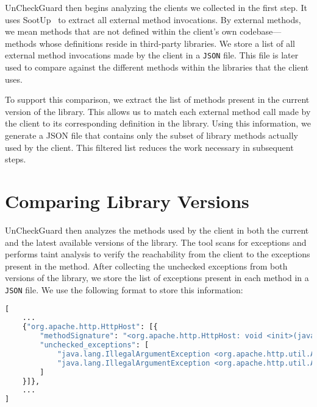 
UnCheckGuard then begins analyzing the clients we collected in the first step. It uses SootUp~\cite{Karakaya24:_SootUp} to extract all external method invocations. By external methods, we mean methods that are not defined within the client's own codebase—methods whose definitions reside in third-party libraries. We store a list of all external method invocations made by the client in a \texttt{JSON} file. This file is later used to compare against the different methods within the libraries that the client uses.

To support this comparison, we extract the list of methods present in the current version of the library. This allows us to match each external method call made by the client to its corresponding definition in the library. Using this information, we generate a JSON file that contains only the subset of library methods actually used by the client. This filtered list reduces the work necessary in subsequent steps.


\section{Comparing Library Versions}

UnCheckGuard then analyzes the methods used by the client in both the current and the latest available versions of the library. The tool scans for exceptions and performs taint analysis to verify the reachability from the client to the exceptions present in the method. After collecting the unchecked exceptions from both versions of the library, we store the list of exceptions present in each method in a \texttt{JSON} file. We use the following format to store this information:
\begin{lstlisting}[language=python]
[
    ...
    {"org.apache.http.HttpHost": [{
        "methodSignature": "<org.apache.http.HttpHost: void <init>(java.lang.String,int)>",
        "unchecked_exceptions": [
            "java.lang.IllegalArgumentException <org.apache.http.util.Args: java.lang.CharSequence containsNoBlanks(java.lang.CharSequence,java.lang.String)>",
            "java.lang.IllegalArgumentException <org.apache.http.util.Args: java.lang.CharSequence containsNoBlanks(java.lang.CharSequence,java.lang.String)>"
        ]
    }]},
    ...
]
\end{lstlisting}

